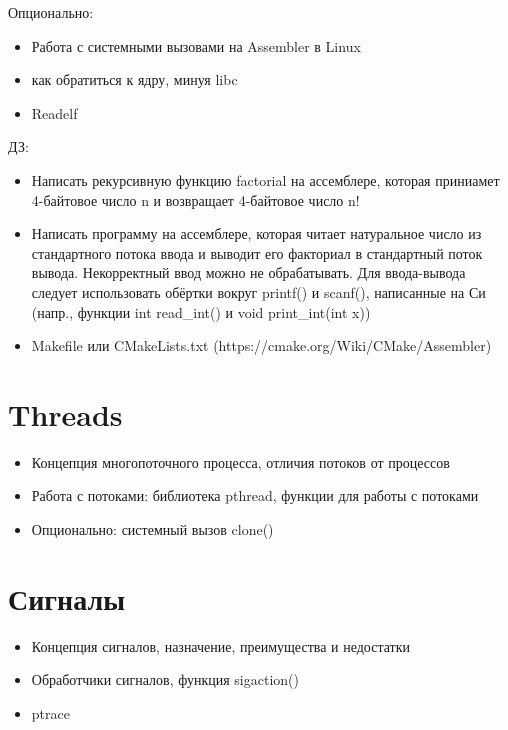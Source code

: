 \documentclass{article}
\begin{document}
    Опционально:
    \begin{itemize}
        \item Работа с системными вызовами на Assembler в Linux
        \item как обратиться к ядру, минуя libc
        \item Readelf
    \end{itemize}

    ДЗ:
    \begin{itemize}
        \item Написать рекурсивную функцию factorial на ассемблере, которая приниамет 4-байтовое число n и возвращает 4-байтовое число n!
        \item Написать программу на ассемблере, которая читает натуральное число из стандартного потока ввода и выводит его факториал в стандартный поток вывода. Некорректный ввод можно не обрабатывать. Для ввода-вывода следует использовать обёртки вокруг printf() и scanf(), написанные на Си (напр., функции int read\_int() и void print\_int(int x))
        \item Makefile или CMakeLists.txt (https://cmake.org/Wiki/CMake/Assembler)
    \end{itemize}

\section{Threads}

    \begin{itemize}
        \item Концепция многопоточного процесса, отличия потоков от процессов
        \item Работа с потоками: библиотека pthread, функции для работы с потоками
        \item Опционально: системный вызов clone()
    \end{itemize}

\section{Сигналы}

    \begin{itemize}
        \item Концепция сигналов, назначение, преимущества и недостатки
        \item Обработчики сигналов, функция sigaction()
        \item ptrace
    \end{itemize}
\end{document}
